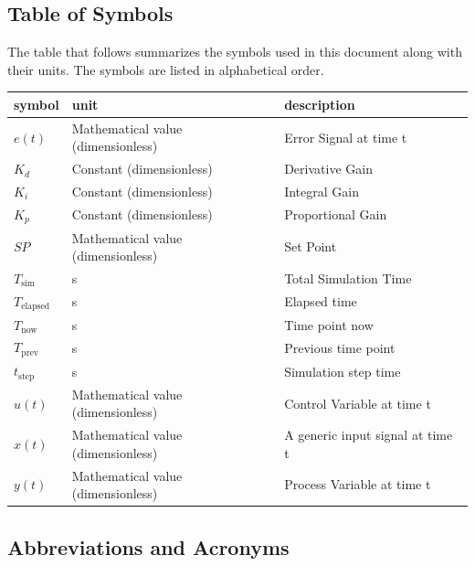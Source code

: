 \documentclass[12pt]{article}
\begin{document}
\subsection{Table of Symbols}

The table that follows summarizes the symbols used in this document along with
their units. The symbols are listed in alphabetical order.

\renewcommand{\arraystretch}{1.2}
\noindent \begin{longtable*}{l l p{9cm}} \toprule
\textbf{symbol} & \textbf{unit} & \textbf{description}\\
\midrule
$e(t)$ & Mathematical value (dimensionless) & Error Signal at time t
\\
$K_d$ & Constant (dimensionless) & Derivative Gain
\\
$K_i$ &  Constant (dimensionless) & Integral Gain
\\
$K_p$ &  Constant (dimensionless) & Proportional Gain
\\
$SP$ & Mathematical value (dimensionless) & Set Point
\\
$T_\text{sim}$ & \si[per-mode=symbol] {\second} & Total Simulation Time
\\
$T_\text{elapsed}$ & \si[per-mode=symbol] {\second} & Elapsed time
\\
$T_\text{now}$ & \si[per-mode=symbol] {\second} & Time point now
\\ 
$T_\text{prev}$ & \si[per-mode=symbol] {\second} & Previous time point
\\
$t_\text{step}$ & \si[per-mode=symbol] {\second} & Simulation step time
\\
$u(t)$ & Mathematical value (dimensionless) & Control Variable at time t
\\
$x(t)$ & Mathematical value (dimensionless) & A generic input signal at time t
\\
$y(t)$ & Mathematical value (dimensionless) & Process Variable at time t
\\ 
\bottomrule
\end{longtable*}

\subsection{Abbreviations and Acronyms}
\end{document}
